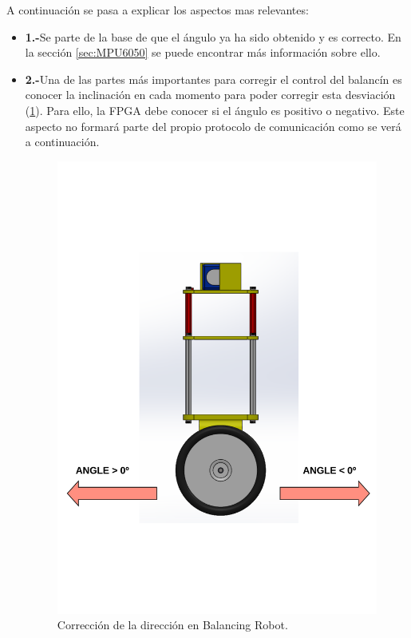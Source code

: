 A continuación se pasa a explicar los aspectos mas relevantes: 

\begin{itemize}
	\item \textbf{1.-}Se parte de la base de que el ángulo ya ha sido obtenido y es correcto. En la sección \ref{sec:MPU6050} se puede encontrar más información sobre ello.
	\item \textbf{2.-}Una de las partes más importantes para corregir el control del balancín es conocer la inclinación en cada momento para poder corregir esta desviación (\ref{fig:angle_correction}). Para ello, la FPGA debe conocer si el ángulo es positivo o negativo. Este aspecto no formará parte del propio protocolo de comunicación como se verá a continuación.
	
	\begin{figure}[H]
		\center
		\includegraphics[trim = 0cm 4cm 0mm 4cm, clip,scale=0.7]{imagenes/Balancing_robot/angle_correction.pdf}
		\caption{Corrección de la dirección en Balancing Robot.}
		\label{fig:angle_correction}
	\end{figure}
	

\end{itemize}
